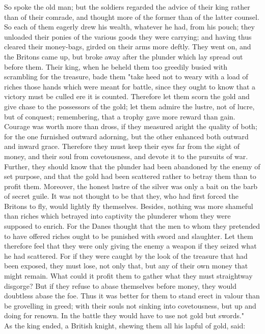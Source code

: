 \documentclass[10pt,a4paper]{report}
\begin{document}
So spoke the old man; but the soldiers regarded the advice of their king rather than of their comrade, and thought more of the former than of the latter counsel. So each of them eagerly drew his wealth, whatever he had, from his pouch; they unloaded their ponies of the various goods they were carrying; and having thus cleared their money-bags, girded on their arms more deftly. They went on, and the Britons came up, but broke away after the plunder which lay spread out before them. Their king, when he beheld them too greedily busied with scrambling for the treasure, bade them "take heed not to weary with a load of riches those hands which were meant for battle, since they ought to know that a victory must be culled ere it is counted. Therefore let them scorn the gold and give chase to the possessors of the gold; let them admire the lustre, not of lucre, but of conquest; remembering, that a trophy gave more reward than gain. Courage was worth more than dross, if they measured aright the quality of both; for the one furnished outward adorning, but the other enhanced both outward and inward grace. Therefore they must keep their eyes far from the sight of money, and their soul from covetousness, and devote it to the pursuits of war. Further, they should know that the plunder had been abandoned by the enemy of set purpose, and that the gold had been scattered rather to betray them than to profit them. Moreover, the honest lustre of the silver was only a bait on the barb of secret guile. It was not thought to be that they, who had first forced the Britons to fly, would lightly fly themselves. Besides, nothing was more shameful than riches which betrayed into captivity the plunderer whom they were supposed to enrich. For the Danes thought that the men to whom they pretended to have offered riches ought to be punished with sword and slaughter. Let them therefore feel that they were only giving the enemy a weapon if they seized what he had scattered. For if they were caught by the look of the treasure that had been exposed, they must lose, not only that, but any of their own money that might remain. What could it profit them to gather what they must straightway disgorge? But if they refuse to abase themselves before money, they would doubtless abase the foe. Thus it was better for them to stand erect in valour than be grovelling in greed; with their souls not sinking into covetousness, but up and doing for renown. In the battle they would have to use not gold but swords."\\

As the king ended, a British knight, shewing them all his lapful of gold, said:\\
\end{document}
